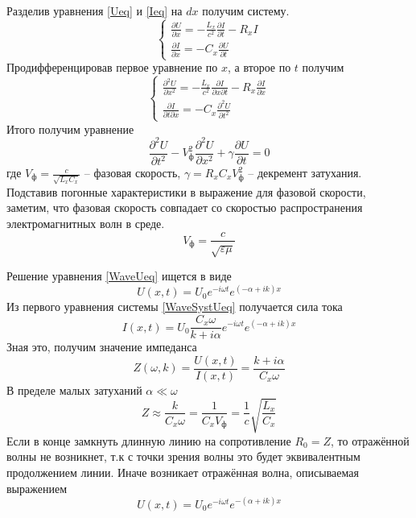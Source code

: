 \documentclass[a4paper,12pt]{extarticle}
\begin{document}
 	Разделив уравнения \eqref{Ueq} и \eqref{Ieq} на $dx$ получим систему.
 	\begin{equation}
 		\begin{cases}
 			\frac{\partial U}{\partial x}=-\frac{L_x}{c^2}\frac{\partial I}{\partial t}-R_xI
 			\\
 			\frac{\partial I}{\partial x}=-C_x\frac{\partial U}{\partial t}
 		\end{cases}
 	\end{equation}
 	Продифференцировав первое уравнение по $x$, а второе по $t$ получим
 	\begin{equation}\label{WaveSystUeq}
 		\begin{cases}
 			\frac{\partial^2 U}{\partial x^2}=-\frac{L_x}{c^2}\frac{\partial I}{\partial x\partial t}-R_x\frac{\partial I}{\partial x}
 			\\
 			\frac{\partial I}{\partial t\partial x}=-C_x\frac{\partial^2 U}{\partial t^2}
 		\end{cases}
 	\end{equation}
 	Итого получим уравнение
 	\begin{equation}\label{WaveUeq}
 		\frac{\partial^2 U}{\partial t^2}-V^2_\text{ф}\frac{\partial^2 U}{\partial x^2}+\gamma\frac{\partial U}{\partial t}=0
 	\end{equation}
 	где $V_\text{ф}=\frac{c}{\sqrt{L_xC_x}}$ -- фазовая скорость, $\gamma=R_xC_xV^2_\text{ф}$ -- декремент затухания. Подставив погонные характеристики в выражение для фазовой скорости, заметим, что фазовая скорость совпадает со скоростью распространения электромагнитных волн в среде.
 	\begin{equation}
 		V_\text{ф}=\frac{c}{\sqrt{\varepsilon\mu}}
 	\end{equation}
 	
 	Решение уравнения \eqref{WaveUeq} ищется в виде
 	\begin{equation}\label{WaveUsol}
 		U(x,t)=U_0e^{-i\omega t}e^{(-\alpha+ik)x}
 	\end{equation}
 	Из первого уравнения системы \eqref{WaveSystUeq} получается сила тока
 	\begin{equation}
 		I(x,t)=U_0\frac{C_x\omega}{k+i\alpha}e^{-i\omega t}e^{(-\alpha+ik)x}
 	\end{equation}
 	Зная это, получим значение импеданса
 	\begin{equation}
 		Z(\omega,k)=\frac{U(x,t)}{I(x,t)}=\frac{k+i\alpha}{C_x\omega}
 	\end{equation}
 	В пределе малых затуханий $\alpha\ll\omega$
 	\begin{equation}
 		Z\approx\frac{k}{C_x\omega}=\frac{1}{C_xV_\text{ф}}=\frac{1}{c}\sqrt{\frac{L_x}{C_x}}
 	\end{equation}
 	Если в конце замкнуть длинную линию на сопротивление $R_0=Z$, то отражённой волны не возникнет, т.к с точки зрения волны это будет эквивалентным продолжением линии. Иначе возникает отражённая волна, описываемая выражением
 	\begin{equation}
 		U(x,t)=U_0e^{-i\omega t}e^{-(\alpha+ik)x}
 	\end{equation}
 
\end{document}
